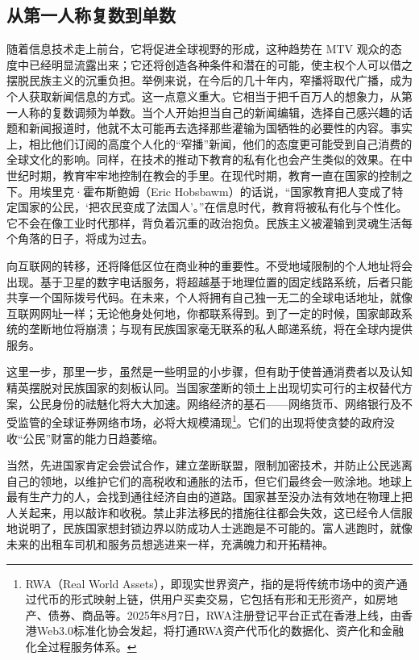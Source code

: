 \subsection{从第一人称复数到单数}

随着信息技术走上前台，它将促进全球视野的形成，这种趋势在 MTV 观众的态度中已经明显流露出来；它还将创造各种条件和潜在的可能，使主权个人可以借之摆脱民族主义的沉重负担。举例来说，在今后的几十年内，窄播将取代广播，成为个人获取新闻信息的方式。这一点意义重大。它相当于把千百万人的想象力，从第一人称的复数调频为单数。当个人开始担当自己的新闻编辑，选择自己感兴趣的话题和新闻报道时，他就不太可能再去选择那些灌输为国牺牲的必要性的内容。事实上，相比他们订阅的高度个人化的“窄播”新闻，他们的态度更可能受到自己消费的全球文化的影响。同样，在技术的推动下教育的私有化也会产生类似的效果。在中世纪时期，教育牢牢地控制在教会的手里。在现代时期，教育一直在国家的控制之下。用埃里克·霍布斯鲍姆（Eric Hobsbawm）的话说，“国家教育把人变成了特定国家的公民，‘把农民变成了法国人’。”在信息时代，教育将被私有化与个性化。它不会在像工业时代那样，背负着沉重的政治抱负。民族主义被灌输到灵魂生活每个角落的日子，将成为过去。

向互联网的转移，还将降低区位在商业种的重要性。不受地域限制的个人地址将会出现。基于卫星的数字电话服务，将超越基于地理位置的固定线路系统，后者只能共享一个国际拨号代码。在未来，个人将拥有自己独一无二的全球电话地址，就像互联网网址一样；无论他身处何地，你都联系得到。到了一定的时候，国家邮政系统的垄断地位将崩溃；与现有民族国家毫无联系的私人邮递系统，将在全球内提供服务。

这里一步，那里一步，虽然是一些明显的小步骤，但有助于使普通消费者以及认知精英摆脱对民族国家的刻板认同。当国家垄断的领土上出现切实可行的主权替代方案，公民身份的祛魅化将大大加速。网络经济的基石——网络货币、网络银行及不受监管的全球证券网络市场，必将大规模涌现\footnote{RWA（Real World Assets），即现实世界资产，指的是将传统市场中的资产通过代币的形式映射上链，供用户买卖交易，它包括有形和无形资产，如房地产、债券、商品等。2025年8月7日，RWA注册登记平台正式在香港上线，由香港Web3.0标准化协会发起，将打通RWA资产代币化的数据化、资产化和金融化全过程服务体系。}。它们的出现将使贪婪的政府没收“公民”财富的能力日趋萎缩。

当然，先进国家肯定会尝试合作，建立垄断联盟，限制加密技术，并防止公民逃离自己的领地，以维护它们的高税收和通胀的法币，但它们最终会一败涂地。地球上最有生产力的人，会找到通往经济自由的道路。国家甚至没办法有效地在物理上把人关起来，用以敲诈和收税。禁止非法移民的措施往往都会失效，这已经令人信服地说明了，民族国家想封锁边界以防成功人士逃跑是不可能的。富人逃跑时，就像未来的出租车司机和服务员想逃进来一样，充满魄力和开拓精神。

